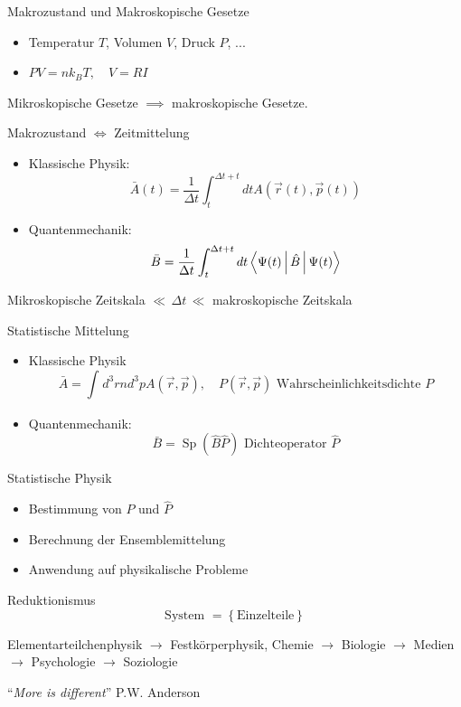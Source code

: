 \documentclass[11pt]{article}
\theoremstyle{plain}
\begin{document}
\begin{description}
  \item Makrozustand und Makroskopische Gesetze
    \begin{itemize}
      \item Temperatur $T$, Volumen $V$, Druck $P$, ...
      \item $P V=nk_BT, \quad V=RI$
    \end{itemize}
  \item Mikroskopische Gesetze $\implies $ makroskopische Gesetze.
  \item Makrozustand $\iff $ Zeitmittelung
    \begin{itemize}
      \item Klassische Physik: \[ \bar{A}(t)= \frac{1}{\Delta t} \int_{t}^{\Delta t +t} dt
        A(\vec{r}(t),\vec{p}(t))\] 
      \item Quantenmechanik: \[ \bar{B} = \frac{1}{\Delta t} \int_{t}^{\Delta t+t} dt
        \Braket{\Psi(t) | \hat{B} | \Psi (t)}\] 
    \end{itemize}
  \item Mikroskopische Zeitskala $\ll\, \Delta t \, \ll$ makroskopische Zeitskala
  \item Statistische Mittelung
    \begin{itemize}
      \item Klassische Physik \[ \bar{A} = \int_{}^{} d^3r n d^3p A(\vec{r}, \vec{p}),
        \quad P(\vec{r}, \vec{p}) \text{ Wahrscheinlichkeitsdichte } P \] 
      \item Quantenmechanik: \[ \bar{B}= \operatorname{Sp}(\hat{B} \hat{P})
          \text{ Dichteoperator } \hat{P} \]   
    \end{itemize}
  \item Statistische Physik
    \begin{itemize}
      \item Bestimmung von $P$ und $\hat{P}$
      \item Berechnung der Ensemblemittelung
      \item Anwendung auf physikalische Probleme
    \end{itemize}
  \item Reduktionismus \[ \text{System } = \left\{ \text{Einzelteile} \right\} \] 
  \item Elementarteilchenphysik $\to $ Festk\"orperphysik, Chemie $\to $
    Biologie $\to $ Medien $\to $ Psychologie $\to $ Soziologie
  \item ``\emph{More is different}'' P.W. Anderson
    
\end{description}
\end{document}
